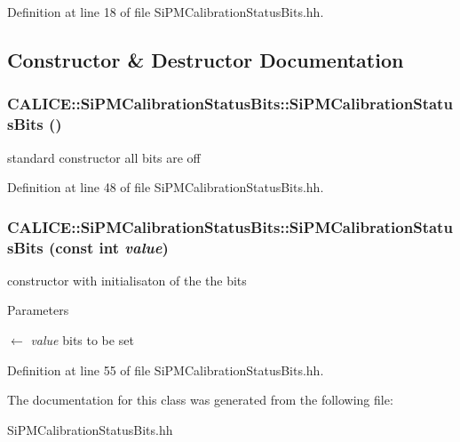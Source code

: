Definition at line 18 of file SiPMCalibrationStatusBits.hh.

\subsection{Constructor \& Destructor Documentation}
\subsubsection[{SiPMCalibrationStatusBits}]{\setlength{\rightskip}{0pt plus 5cm}CALICE::SiPMCalibrationStatusBits::SiPMCalibrationStatusBits ()\hspace{0.3cm}{\ttfamily  [inline]}}\label{classCALICE_1_1SiPMCalibrationStatusBits_a32bd555dc85cbbeb7d0545b537c78603}


standard constructor all bits are off 

Definition at line 48 of file SiPMCalibrationStatusBits.hh.
\subsubsection[{SiPMCalibrationStatusBits}]{\setlength{\rightskip}{0pt plus 5cm}CALICE::SiPMCalibrationStatusBits::SiPMCalibrationStatusBits (const int {\em value})\hspace{0.3cm}{\ttfamily  [inline]}}\label{classCALICE_1_1SiPMCalibrationStatusBits_abef5509679994c0b0a00dd8e44c4c57d}


constructor with initialisaton of the the bits 
\begin{DoxyParams}{Parameters}
\item[\mbox{$\leftarrow$} {\em value}]bits to be set \end{DoxyParams}


Definition at line 55 of file SiPMCalibrationStatusBits.hh.

The documentation for this class was generated from the following file:\begin{DoxyCompactItemize}
\item 
SiPMCalibrationStatusBits.hh\end{DoxyCompactItemize}
